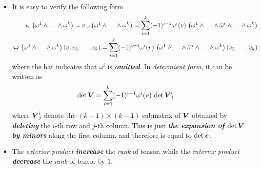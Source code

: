 \documentclass[11pt]{article}
\begin{document}
\begin{itemize}
\item \begin{remark} It is easy to verify the following form
\begin{align}
\iota_v\left(\omega^1 \wedge \ldots \wedge \omega^{k}\right) = v\mathbin{\lrcorner }{\left(\omega^1 \wedge \ldots \wedge \omega^{k}\right)}= \sum_{i=1}^{k}(-1)^{i-1}\omega^{i}(v)\,\left(\omega^1 \wedge \ldots \wedge \widehat{\omega}^{i} \wedge \ldots \wedge \omega^{k}\right) \label{eqn: interior_product_expansion}\\
\Leftrightarrow \left(\omega^1 \wedge \ldots \wedge \omega^{k}\right)(v, v_2, \ldots, v_k)= \sum_{i=1}^{k}(-1)^{i-1}\omega^{i}(v)\,\left(\omega^1 \wedge \ldots \wedge \widehat{\omega}^{i} \wedge \ldots \wedge \omega^{k}\right)(v_2, \ldots, v_k) \nonumber
\end{align} where the hat indicates that $\omega^i$ is \emph{\textbf{omitted}}. In \emph{determiant form}, it can be written as
\begin{align}
\det{\boldsymbol{V}} &=  \sum_{i=1}^{k}(-1)^{i-1}\omega^{i}(v)\,\det\boldsymbol{V}_{1}^{i}  \label{eqn: interior_product_determinant_expansion}
\end{align} where $\boldsymbol{V}_{j}^{i}$ denote the $(k -1) \times (k -1)$ submatrix of $\boldsymbol{V}$ obtained by \emph{\textbf{deleting}} the $i$-th row and $j$-th column.  This is just \emph{\textbf{the expansion of $\det \boldsymbol{V}$ by minors}} along the first column, and therefore is equal to $\det \boldsymbol{v}$. 
\end{remark}

\item \begin{remark} 
The \emph{exterior product} \emph{\textbf{increase}} the \emph{rank} of tensor, while the \emph{interior product} \emph{\textbf{decrease}} the \emph{rank} of tensor by $1$.
\end{remark}

\end{itemize}
\end{document}
